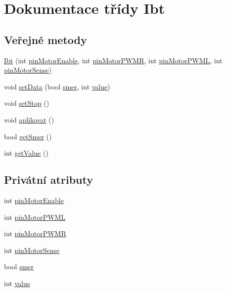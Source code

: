 \hypertarget{class_ibt}{}\section{Dokumentace třídy Ibt}
\label{class_ibt}
\subsection*{Veřejné metody}
\begin{DoxyCompactItemize}
\item 
\hyperlink{class_ibt_a7095837f79f0d4329a6f44b54480c26e}{Ibt} (int \hyperlink{class_ibt_ad6d59ade8bcb80ee7ee06c475a381dea}{pin\+Motor\+Enable}, int \hyperlink{class_ibt_a7112beac87f2013be51d48203e23a1f5}{pin\+Motor\+P\+W\+MR}, int \hyperlink{class_ibt_a392b4ea56f7346c43b9562e77fe35722}{pin\+Motor\+P\+W\+ML}, int \hyperlink{class_ibt_ac52829806ce90d85f76320292e7027a4}{pin\+Motor\+Sense})
\item 
void \hyperlink{class_ibt_ad5096d0ae4d1d1ce3714868f2f4b3fec}{set\+Data} (bool \hyperlink{class_ibt_ab15472546c05e0760f6a1b282fad58fb}{smer}, int \hyperlink{class_ibt_a8e62674f6908473dc87800a656142d7c}{value})
\item 
void \hyperlink{class_ibt_ade1b0109381b41dc9cd254de475a6c16}{set\+Stop} ()
\item 
void \hyperlink{class_ibt_abf510206cd1ab3c5067fd1662a1e63f2}{aplikovat} ()
\item 
bool \hyperlink{class_ibt_ad1c2a7fa28e908578fa73f1978c3f0c5}{get\+Smer} ()
\item 
int \hyperlink{class_ibt_ab4b9fec5dcc3520653d1d42482a36f80}{get\+Value} ()
\end{DoxyCompactItemize}
\subsection*{Privátní atributy}
\begin{DoxyCompactItemize}
\item 
int \hyperlink{class_ibt_ad6d59ade8bcb80ee7ee06c475a381dea}{pin\+Motor\+Enable}
\item 
int \hyperlink{class_ibt_a392b4ea56f7346c43b9562e77fe35722}{pin\+Motor\+P\+W\+ML}
\item 
int \hyperlink{class_ibt_a7112beac87f2013be51d48203e23a1f5}{pin\+Motor\+P\+W\+MR}
\item 
int \hyperlink{class_ibt_ac52829806ce90d85f76320292e7027a4}{pin\+Motor\+Sense}
\item 
bool \hyperlink{class_ibt_ab15472546c05e0760f6a1b282fad58fb}{smer}
\item 
int \hyperlink{class_ibt_a8e62674f6908473dc87800a656142d7c}{value}
\end{DoxyCompactItemize}


